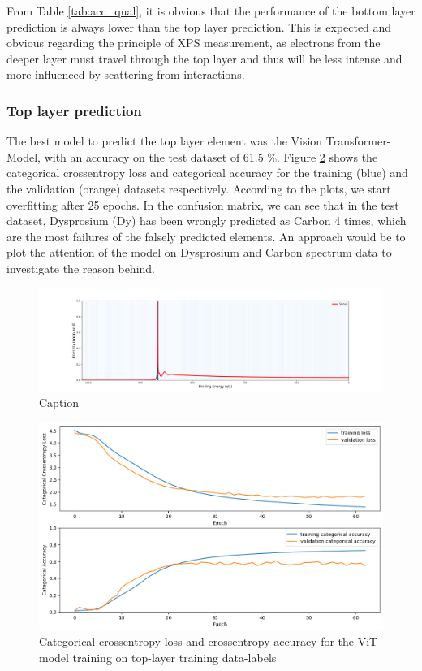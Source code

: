 From Table \ref{tab:acc_qual}, it is obvious that the performance of the bottom layer prediction is always lower than the top layer prediction. This is expected and obvious regarding the principle of XPS measurement, as electrons from the deeper layer must travel through the top layer and thus will be less intense and more influenced by scattering from interactions.



\subsubsection{Top layer prediction}
The best model to predict the top layer element was the Vision Transformer-Model, with an accuracy on the test dataset of 61.5 \%. Figure \ref{fig:top_best_loss} shows the categorical crossentropy loss and categorical accuracy for the training (blue) and the validation (orange) datasets respectively. According to the plots, we start overfitting after 25 epochs. In the confusion matrix, we can see that in the test dataset, Dysprosium (Dy) has been wrongly predicted as Carbon 4 times, which are the most failures of the falsely predicted elements. An approach would be to plot the attention of the model on Dysprosium and Carbon spectrum data to investigate the reason behind.

\begin{figure}
    \centering
    \includegraphics{Figures/attention_map_dy.png}
    \caption{Caption}
    \label{att:dy}
\end{figure}

\begin{figure}[H]
    \centering
    \includegraphics[width=\textwidth]{Figures/top_best_loss_acc_vit_4_32_3_4_64.png}
    \caption{Categorical crossentropy loss and crossentropy accuracy for the ViT model training on top-layer training data-labels}
    \label{fig:top_best_loss}
\end{figure}

